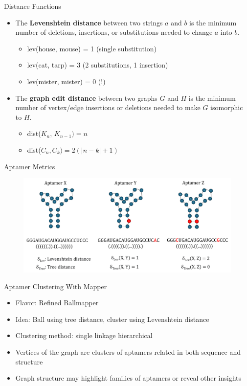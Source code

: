 \documentclass{beamer}
\begin{document}
\begin{frame}{Distance Functions}
  \begin{itemize}
    \item The \textbf{Levenshtein distance} between two strings $a$ and $b$ is the minimum number of deletions, insertions, or substitutions needed to change $a$ into $b$.
    \begin{itemize}
      \item lev(house, mouse) = 1 (single substitution)
      \item lev(cat, tarp) = 3 (2 substitutions, 1 insertion)
      \item lev(mister, mister) = 0 (!)
    \end{itemize}
    \item The \textbf{graph edit distance} between two graphs $G$ and $H$ is the minimum number of vertex/edge insertions or deletions needed to make $G$ isomorphic to $H$.
    \begin{itemize}
      \item dist($K_n$, $K_{n-1}) = n$
      \item dist($C_n, C_k) = 2(|n-k|+1)$
    \end{itemize}
  \end{itemize}
\end{frame}

\begin{frame}{Aptamer Metrics}
  \begin{figure}
    \begin{center}
      \hspace*{-.75cm}\includegraphics[width=1.15\textwidth]{aptamers.png}
    \end{center}
  \end{figure}
\end{frame}

\begin{frame}{Aptamer Clustering With Mapper}
  \begin{itemize}
    \item Flavor: Refined Ballmapper
    \item Idea: Ball using tree distance, cluster using Levenshtein distance
    \item Clustering method: single linkage hierarchical
    \item Vertices of the graph are clusters of aptamers related in both sequence and structure
    \item Graph structure may highlight families of aptamers or reveal other insights
  \end{itemize}
\end{frame}
\end{document}
